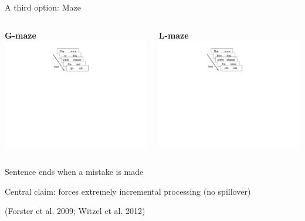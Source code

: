\documentclass[12pt, xcolor=beamer,table,dvipsnames, ignorenonframetext, ngerman]{beamer}
\begin{document}
\begin{frame}{A third option: Maze}
\begin{columns}
	\begin{column}{0.5\textwidth}
		\begin{center}
		\textbf{\large G-maze}
		\includegraphics[clip, trim=9cm 14cm 11cm 1cm,width=.9\textwidth]{gmaze.pdf}
		\end{center}
	
	\end{column}
	\begin{column}{0.5\textwidth} 
		\begin{center}
		\textbf{\large L-maze}
			\includegraphics[clip, trim=9cm 14cm 11cm 1cm,width=.9\textwidth]{lmaze.pdf}
		\end{center}
	\end{column}
\end{columns}

\medskip

Sentence ends when a mistake is made

Central claim: forces extremely incremental processing (no spillover)

\begin{flushright}
	{\small(Forster et al. 2009; Witzel et al. 2012)}
\end{flushright}
\end{frame}
\end{document}

